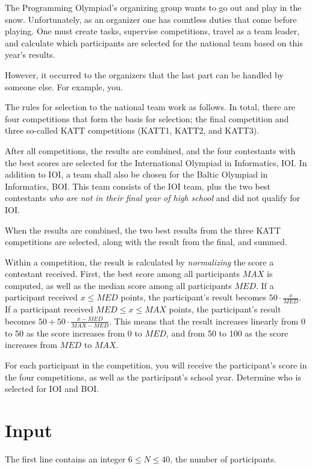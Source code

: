 The Programming Olympiad's organizing group wants to go out and play in the snow.
Unfortunately, as an organizer one has countless duties that come before playing.
One must create tasks, supervise competitions, travel as a team leader, and calculate which participants are selected for the national team based on this year's results.

However, it occurred to the organizers that the last part can be handled by someone else.
For example, you.

The rules for selection to the national team work as follows.
In total, there are four competitions that form the basis for selection; the final competition and three so-called KATT competitions (KATT1, KATT2, and KATT3).

After all competitions, the results are combined, and the four contestants with the best scores are selected for the International Olympiad in Informatics, IOI.
In addition to IOI, a team shall also be chosen for the Baltic Olympiad in Informatics, BOI.
This team consists of the IOI team, plus the two best contestants \emph{who are not in their final year of high school} and did not qualify for IOI.

When the results are combined, the two best results from the three KATT competitions are selected, along with the result from the final, and summed.

Within a competition, the result is calculated by \emph{normalizing} the score a contestant received.
First, the best score among all participants $MAX$ is computed, as well as the median score among all participants $MED$.
If a participant received $x \le MED$ points, the participant's result becomes $50 \cdot \frac{x}{MED}$.
If a participant received $MED \le x \le MAX$ points, the participant's result becomes $50 + 50 \cdot \frac{x - MED}{MAX - MED}$.
This means that the result increases linearly from 0 to 50 as the score increases from 0 to $MED$,
and from 50 to 100 as the score increases from $MED$ to $MAX$.

For each participant in the competition, you will receive the participant's score in the four competitions, as well as the participant's school year. Determine who is selected for IOI and BOI.

\section*{Input}
The first line contains an integer $6 \le N \le 40$, the number of participants.

